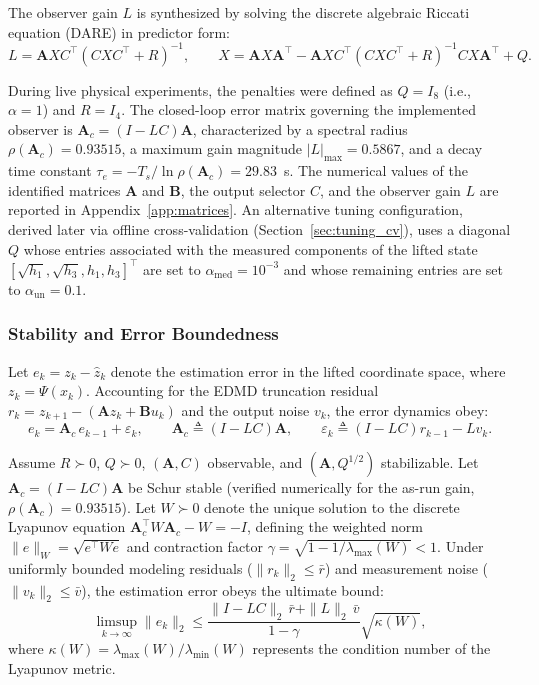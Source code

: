 \documentclass[asi,article,accept,pdftex,moreauthors]{Definitions/mdpi}
\newcommand{\rev}[1]{#1}%
\begin{document}
{The observer gain $L$ is synthesized by solving the discrete algebraic Riccati equation (DARE) in predictor form:
\begin{equation}
L=\mathbf AXC^\top(CXC^\top+R)^{-1},\qquad
X=\mathbf AX\mathbf A^\top-\mathbf AXC^\top(CXC^\top+R)^{-1}CX\mathbf A^\top+Q.
\label{eq:dare}
\end{equation}

During live physical experiments, the penalties were defined as $Q=I_8$ \mbox{(i.e., $\alpha=1$)} and $R=I_4$. The closed-loop error matrix governing the implemented observer is $\mathbf A_c=(I-LC)\mathbf A$, characterized by a spectral radius $\rho(\mathbf A_c)=0.93515$, a maximum gain magnitude $|L|_{\max}=0.5867$, and a decay time constant $\tau_e=-T_s/\ln\rho(\mathbf A_c)=29.83$~s. The numerical values of the identified matrices $\mathbf A$ and $\mathbf B$, the output selector $C$, and the observer gain $L$ are reported in Appendix~\ref{app:matrices}. An alternative tuning configuration, derived later via offline cross-validation (Section~\ref{sec:tuning_cv}), uses \rev{a diagonal $Q$ whose entries} associated with the measured components of the lifted state $[\sqrt{h_1},\sqrt{h_3},h_1,h_3]^\top$ are set to $\alpha_\mathrm{med}=10^{-3}$ and \rev{whose} remaining entries \rev{are set} to $\alpha_\mathrm{un}=0.1$.}

\subsubsection{Stability and Error Boundedness}
\label{sec:stability}

Let $e_k=z_k-\hat z_k$ denote the estimation error in the lifted coordinate space, where $z_k=\Psi(x_k)$. Accounting for the EDMD truncation residual $r_k=z_{k+1}-(\mathbf Az_k+\mathbf Bu_k)$ and the output noise $v_k$, the error dynamics obey:
\begin{equation}
e_{k} = \mathbf A_c\,e_{k-1}+\varepsilon_k,\qquad \mathbf A_c\triangleq(I-LC)\mathbf A,\qquad
\varepsilon_k\triangleq(I-LC)r_{k-1}-Lv_k .
\label{eq:error_dyn}
\end{equation}

\begin{Proposition}
\label{prop:stability}
{Assume $R\succ0$, $Q\succ0$, $(\mathbf A,C)$ observable, and $(\mathbf A,Q^{1/2})$ stabilizable. Let $\mathbf A_c=(I-LC)\mathbf A$ be Schur stable (verified numerically for the as-run gain, $\rho(\mathbf A_c)=0.93515$). Let $W\succ0$ denote the unique solution to the discrete Lyapunov equation $\mathbf A_c^\top W\mathbf A_c-W=-I$, defining the weighted norm $\|e\|_W=\sqrt{e^\top We}$ and contraction factor $\gamma=\sqrt{1-1/\lambda_{\max}(W)}<1$. Under uniformly bounded modeling residuals ($\|r_k\|_2\le\bar r$) and measurement noise ($\|v_k\|_2\le\bar v$), the estimation error obeys the ultimate bound:
\begin{equation*}
\limsup_{k\to\infty}\|e_k\|_2\le\frac{\|I-LC\|_2\,\bar r+\|L\|_2\,\bar v}{1-\gamma}\sqrt{\kappa(W)},
\end{equation*}
where $\kappa(W) = \lambda_{\max}(W)/\lambda_{\min}(W)$ represents the condition number of the Lyapunov metric.}
\end{Proposition}
\end{document}
